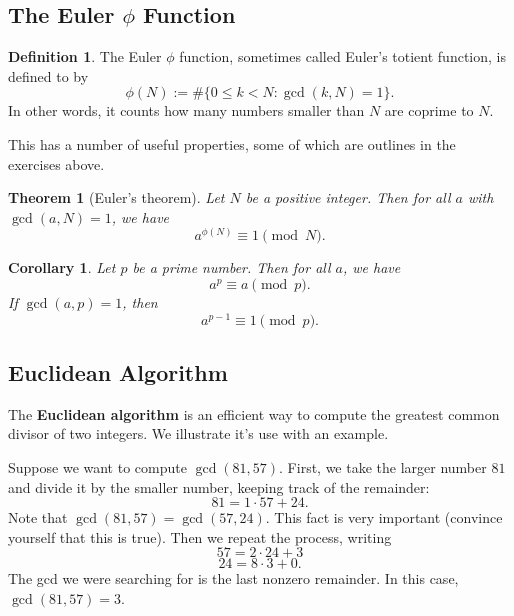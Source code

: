 \documentclass{article}
\newtheorem{theorem}{Theorem}%
\newtheorem{corollary}{Corollary}[theorem]
\theoremstyle{definition}
\newtheorem{definition}{Definition}%
\theoremstyle{remark}
\begin{document}
    \subsection{The Euler \(\phi\) Function}

        \begin{definition}
            The Euler \(\phi\) function, sometimes called Euler's totient function, is defined to by
            \[\phi(N) := \#\{0\leq k<N : \gcd(k,N) = 1\}.\]
            In other words, it counts how many numbers smaller than \(N\) are coprime to \(N\).
        \end{definition}

        This has a number of useful properties, some of which are outlines in the exercises above.

        \begin{theorem}[Euler's theorem]
            Let \(N\) be a positive integer.
            Then for all \(a\) with \(\gcd(a,N)=1\), we have
            \[a^{\phi(N)}\equiv 1\pmod{N}.\]
        \end{theorem}

        \begin{corollary}
            Let \(p\) be a prime number.
            Then for all \(a\), we have
            \[a^p\equiv a\pmod{p}.\]
            If \(\gcd(a,p)=1\), then 
            \[a^{p-1}\equiv 1\pmod{p}.\]
        \end{corollary}

    \subsection{Euclidean Algorithm}

        The \textbf{Euclidean algorithm} is an efficient way to compute the greatest common divisor of two integers.
        We illustrate it's use with an example.
        
        Suppose we want to compute \(\gcd(81,57)\).
        First, we take the larger number \(81\) and divide it by the smaller number, keeping track of the remainder:
        \[81 = 1\cdot 57 + 24.\]
        Note that \(\gcd(81,57)=\gcd(57,24)\).
        This fact is very important (convince yourself that this is true).
        Then we repeat the process, writing
        \[57 = 2\cdot 24 + 3\]
        \[24 = 8\cdot 3 + 0.\]
        The gcd we were searching for is the last nonzero remainder.
        In this case, \(\gcd(81,57) = 3\).
\end{document}
